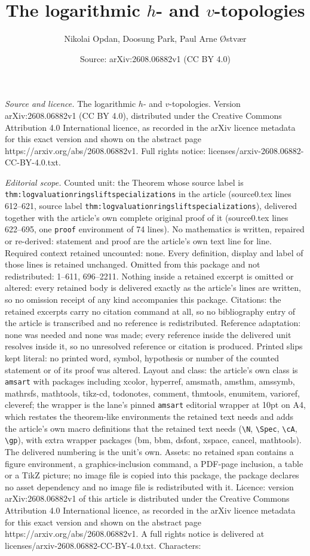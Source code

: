 \documentclass[10pt,a4paper]{amsart}
\title[The logarithmic $h$- and $v$-topologies]{The logarithmic $h$- and $v$-topologies}
\author{Nikolai Opdan, Doosung Park, Paul Arne {\O}stv{\ae}r}
\date{Source: arXiv:2608.06882v1 (CC BY 4.0)}
\begin{document}
\maketitle

\noindent\emph{Source and licence.} The logarithmic $h$- and $v$-topologies. Version arXiv:2608.06882v1 (CC BY 4.0), distributed under the Creative Commons Attribution 4.0 International licence, as recorded in the arXiv licence metadata for this exact version and shown on the abstract page https://arxiv.org/abs/2608.06882v1. Full rights notice: licenses/arxiv-2608.06882-CC-BY-4.0.txt.\par\smallskip

\noindent\textit{Editorial scope.} Counted unit: the Theorem whose source label is \texttt{thm:logvaluationringsliftspecializations} in the article (source0.tex lines 612--621, source label \texttt{thm:logvaluationringsliftspecializations}), delivered together with the article's own complete original proof of it (source0.tex lines 622--695, one \texttt{proof} environment of 74 lines). No mathematics is written, repaired or re-derived: statement and proof are the article's own text line for line. Required context retained uncounted: none. Every definition, display and label of those lines is retained unchanged. Omitted from this package and not redistributed: 1--611, 696--2211. Nothing inside a retained excerpt is omitted or altered: every retained body is delivered exactly as the article's lines are written, so no omission receipt of any kind accompanies this package. Citations: the retained excerpts carry no citation command at all, so no bibliography entry of the article is transcribed and no reference is redistributed. Reference adaptation: none was needed and none was made; every reference inside the delivered unit resolves inside it, so no unresolved reference or citation is produced. Printed slips kept literal: no printed word, symbol, hypothesis or number of the counted statement or of its proof was altered. Layout and class: the article's own class is \texttt{amsart} with packages including xcolor, hyperref, amsmath, amsthm, amssymb, mathrsfs, mathtools, tikz-cd, todonotes, comment, thmtools, enumitem, varioref, cleveref; the wrapper is the lane's pinned \texttt{amsart} editorial wrapper at 10pt on A4, which restates the theorem-like environments the retained text needs and adds the article's own macro definitions that the retained text needs (\texttt{\textbackslash N}, \texttt{\textbackslash Spec}, \texttt{\textbackslash cA}, \texttt{\textbackslash gp}), with extra wrapper packages (bm, bbm, dsfont, xspace, cancel, mathtools). The delivered numbering is the unit's own. Assets: no retained span contains a figure environment, a graphics-inclusion command, a PDF-page inclusion, a table or a TikZ picture; no image file is copied into this package, the package declares no asset dependency and no image file is redistributed with it. Licence: version arXiv:2608.06882v1 of this article is distributed under the Creative Commons Attribution 4.0 International licence, as recorded in the arXiv licence metadata for this exact version and shown on the abstract page https://arxiv.org/abs/2608.06882v1. A full rights notice is delivered at licenses/arxiv-2608.06882-CC-BY-4.0.txt. Characters: 
\end{document}
